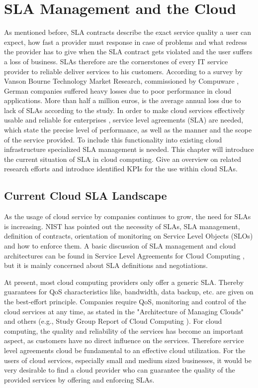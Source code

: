 
\chapter{SLA Management and the Cloud} %

As mentioned before, SLA contracts describe the exact service quality a user can expect, how fast a provider must response in case of problems and what redress the provider has to give when the SLA contract gets violated and the user suffers a loss of business. SLAs therefore are the cornerstones of every IT service provider to reliable deliver services to his customers. According to a survey by Vanson Bourne Technology Market Research, commissioned by Compuware \cite{Bourne}, German companies suffered heavy losses due to poor performance in cloud applications. More than half a million euros, is the average annual loss due to lack of SLAs according to the study. In order to make cloud services effectively usable \cite{IDC} and reliable for enterprises \cite{JTC}, service level agreements (SLA) are needed, which state the precise level of performance, as well as the manner and the scope of the service provided. To include this functionality into existing cloud infrastructure specialized SLA management is needed. This chapter will introduce the current situation of SLA in cloud computing. Give an overview on related research efforts and introduce identified KPIs for the use within cloud SLAs.


\section{Current Cloud SLA Landscape}
As the usage of cloud service by companies continues to grow, the need for SLAs is increasing. NIST  has pointed out the necessity of SLAs, SLA management, definition of contracts, orientation of monitoring on Service Level Objects (SLOs) and how to enforce them. A basic discussion of SLA management and cloud architectures can be found in Service Level Agreements for Cloud Computing \cite{Wieder2011}, but it is mainly concerned about SLA definitions and negotiations.

At present, most cloud computing providers only offer a generic SLA. Thereby guarantees for QoS characteristics like, bandwidth, data backup, etc. are given  on the best-effort principle. Companies require QoS, monitoring and control of the cloud services at any time, as stated in the "Architecture of Managing Clouds" \cite{DMTF2010} and others (e.g., Study Group Report of Cloud Computing \cite{SC38StudyGroup2011}). For cloud computing, the quality and reliability of the services has become an important aspect, as customers have no direct influence on the services. Therefore service level agreements cloud be fundamental to an effective cloud utilization. For the users of cloud services, especially small and medium sized businesses, it would be very desirable to find a cloud provider who can guarantee the quality of the provided services by offering and enforcing SLAs.

